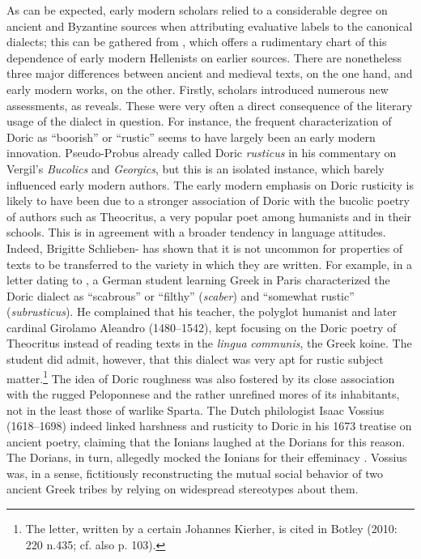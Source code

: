 As can be expected, early modern scholars relied to a considerable degree on ancient and Byzantine sources when attributing evaluative labels to the canonical dialects; this can be gathered from , which offers a rudimentary chart of this dependence of early modern Hellenists on earlier sources. There are nonetheless three major differences between ancient and medieval texts, on the one hand, and early modern works, on the other. Firstly, scholars introduced numerous new assessments, as  reveals. These were very often a direct consequence of the literary usage of the dialect in question. For instance, the frequent characterization of Doric as “boorish” or “rustic” seems to have largely been an early modern innovation. Pseudo-Probus already called Doric \textit{rusticus} in his commentary on Vergil’s \textit{Bucolics} and \textit{Georgics}, but this is an isolated instance, which barely influenced early modern authors. The early modern emphasis on Doric rusticity is likely to have been due to a stronger association of Doric with the bucolic poetry of authors such as Theocritus, a very popular poet among humanists and in their schools. This is in agreement with a broader tendency in language attitudes. Indeed, Brigitte Schlieben-\citet{Lange1992} has shown that it is not uncommon for properties of texts to be transferred to the variety in which they are written. For example, in a letter dating to \citealt{November1511}, a German student learning Greek in Paris characterized the Doric dialect as “scabrous” or “filthy” (\textit{scaber}) and “somewhat rustic” (\textit{subrusticus}). He complained that his teacher, the polyglot humanist and later cardinal Girolamo Aleandro (1480–1542), kept focusing on the Doric poetry of Theocritus instead of reading texts in the \textit{lingua} \textit{communis}, the Greek koine. The student did admit, however, that this dialect was very apt for rustic subject matter.\footnote{The letter, written by a certain Johannes Kierher, is cited in Botley (2010: 220 n.435; cf. also p. 103).} The idea of Doric roughness was also fostered by its close association with the rugged Peloponnese and the rather unrefined mores of its inhabitants, not in the least those of warlike Sparta. The Dutch philologist Isaac Vossius (1618–1698) indeed linked harshness and rusticity to Doric in his 1673 treatise on ancient poetry, claiming that the Ionians laughed at the Dorians for this reason. The Dorians, in turn, allegedly mocked the Ionians for their effeminacy \citep[55]{Vossius1673}. Vossius was, in a sense, fictitiously reconstructing the mutual social behavior of two ancient Greek tribes by relying on widespread stereotypes about them.

